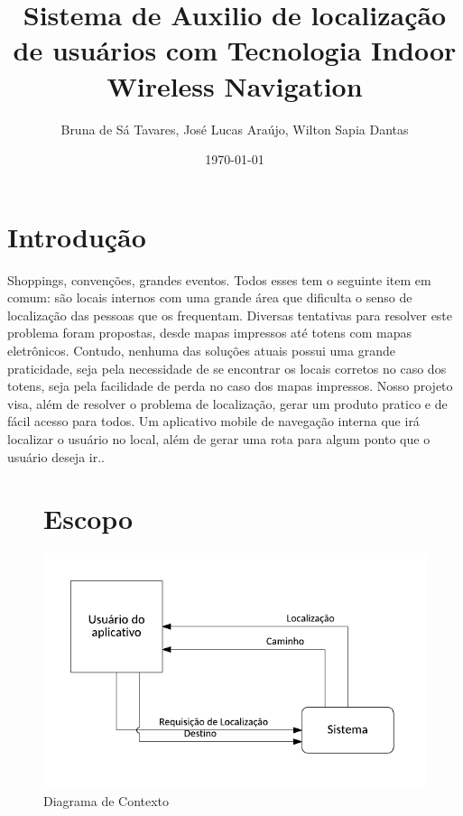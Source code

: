 \documentclass[12pt]{article}
\begin{document}
\title{Sistema de Auxilio de localização de usuários com Tecnologia Indoor Wireless Navigation}
\author{Bruna de Sá Tavares, José Lucas Araújo, Wilton Sapia Dantas}
\date{\today}
\maketitle  

\section*{Introdução}
	Shoppings, convenções, grandes eventos. Todos esses tem o seguinte item em comum: são locais internos com uma grande área que dificulta o senso de localização das pessoas que os frequentam. Diversas tentativas para resolver este problema foram propostas, desde mapas impressos até totens com mapas eletrônicos. Contudo, nenhuma das soluções atuais possui uma grande praticidade, seja pela necessidade de se encontrar os locais corretos no caso dos totens, seja pela facilidade de perda no caso dos mapas impressos. Nosso projeto visa, além de resolver o problema de localização, gerar um produto pratico e de fácil acesso para todos. Um aplicativo mobile de navegação interna que irá localizar o usuário no local, além de gerar uma rota para algum ponto que o usuário deseja ir.\cite{asthana1994indoor}.

\begin{figure}
	\section*{Escopo}
	\centering
	\includegraphics[scale=0.5]{diagramaContexto.PNG}
	\caption{Diagrama de Contexto}
\end{figure}
\end{document}
